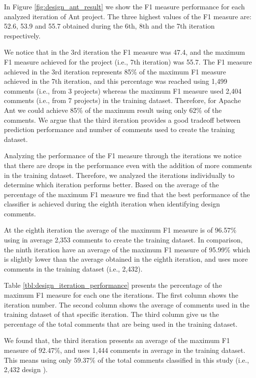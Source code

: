 In Figure \ref{fig:design_ant_result} we show the F1 measure performance for each analyzed iteration of Ant project. The three highest values of the F1 measure are: 52.6, 53.9 and 55.7 obtained during the 6th, 8th and the 7th iteration respectively.

We notice that in the 3rd iteration the F1 measure was 47.4, and the maximum F1 measure achieved for the project (i.e., 7th iteration) was 55.7. The F1 measure achieved in the 3rd iteration represents 85\% of the maximum F1 measure achieved in the 7th iteration, and this percentage was reached using 1,499 comments (i.e., from 3 projects) whereas the maximum F1 measure used 2,404 comments (i.e., from 7 projects) in the training dataset. Therefore, for Apache Ant we could achieve 85\% of the maximum result using only 62\% of the comments. We argue that the third iteration provides a good tradeoff between prediction performance and number of comments used to create the training dataset.

Analyzing the performance of the F1 measure through the iterations we notice that there are drops in the performance even with the addition of more comments in the training dataset. Therefore, we analyzed the iterations individually to determine which iteration performs better. Based on the average of the percentage of the maximum F1 measure we find that the best performance of the classifier is achieved during the eighth iteration when identifying design \SATD comments. 

At the eighth iteration the average of the maximum F1 measure is of 96.57\% using in average 2,353 comments to create the training dataset. In comparison, the ninth iteration have an average of the maximum F1 measure of 95.99\% which is slightly lower than the average obtained in the eighth iteration, and uses more comments in the training dataset (i.e., 2,432). 

Table \ref{tbl:design_iteration_performance} presents the percentage of the maximum F1 measure for each one the iterations. The first column shows the iteration number. The second column shows the average of comments used in the training dataset of that specific iteration. The third column give us the percentage of the total comments that are being used in the training dataset. 

We found that, the third iteration presents an average of the maximum F1 measure of 92.47\%, and uses 1,444 comments in average in the training dataset. This means using only 59.37\% of the total comments classified in this study (i.e., 2,432 design \SATD). 

